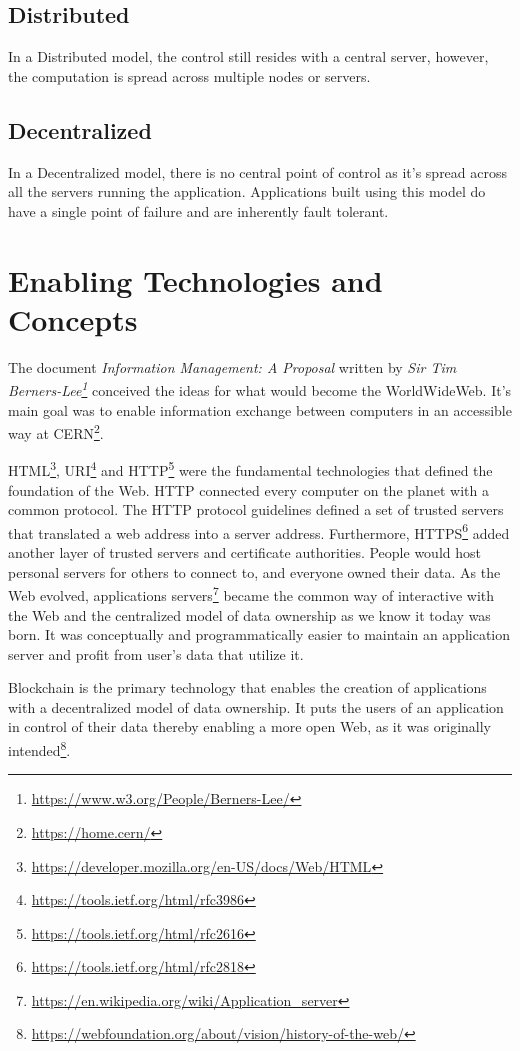 	\subsection{Distributed}
	In a Distributed model, the control still resides with a central server, however, the computation is spread across multiple nodes or servers.
	
	\subsection{Decentralized}
	In a Decentralized model, there is no central point of control as it's spread across all the servers running the application. Applications built using this model do have a single point of failure and are inherently fault tolerant.

\section{Enabling Technologies and Concepts}
	The document \textit{Information Management: A Proposal\cite{berners1989information}} written by \textit{Sir Tim Berners-Lee\footnote{\url{https://www.w3.org/People/Berners-Lee/}}} conceived the ideas for what would become the WorldWideWeb. It's main goal was to enable information exchange between computers in an accessible way at CERN\footnote{\url{https://home.cern/}}.
	
	HTML\footnote{\url{https://developer.mozilla.org/en-US/docs/Web/HTML}}, URI\footnote{\url{https://tools.ietf.org/html/rfc3986}} and HTTP\footnote{\url{https://tools.ietf.org/html/rfc2616}} were the fundamental technologies that defined the foundation of the Web. HTTP connected every computer on the planet with a common protocol. The HTTP protocol guidelines defined a set of trusted servers that translated a web address into a server address. Furthermore, HTTPS\footnote{\url{https://tools.ietf.org/html/rfc2818}} added another layer of trusted servers and certificate authorities. People would host personal servers for others to connect to, and everyone owned their data\cite{raval2016decentralized}. As the Web evolved, applications servers\footnote{\url{https://en.wikipedia.org/wiki/Application_server}} became the common way of interactive with the Web and the centralized model of data ownership as we know it today was born\cite{raval2016decentralized}. It was conceptually and programmatically easier to maintain an application server and profit from user's data that utilize it.
	
	Blockchain is the primary technology that enables the creation of applications with a decentralized model of data ownership. It puts the users of an application in control of their data thereby enabling a more open Web, as it was originally intended\footnote{\url{https://webfoundation.org/about/vision/history-of-the-web/}}.
	
